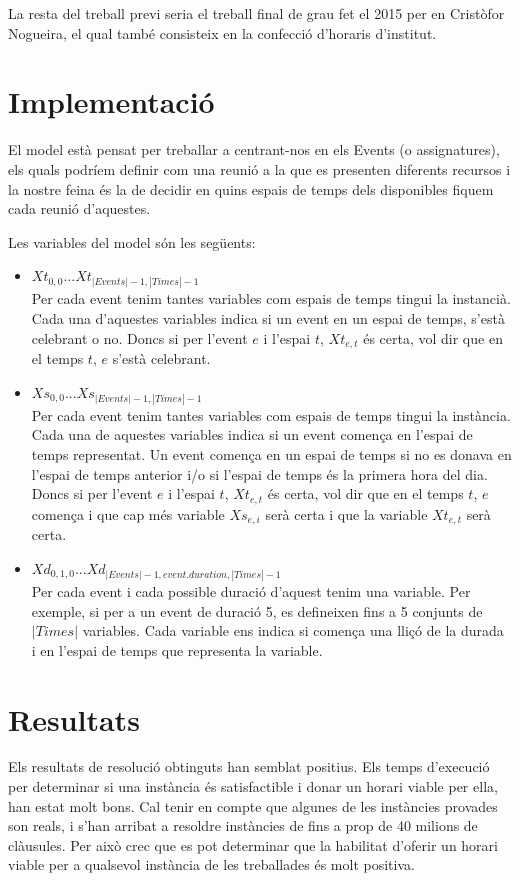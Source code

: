 \documentclass[11pt,a4paper,oneside]{article}
\begin{document}
    La resta del treball previ seria el treball final de grau fet el 2015 per en Cristòfor Nogueira, el qual també consisteix en la confecció d'horaris d'institut.

  \section{Implementació}


  El model està pensat per treballar a centrant-nos en els Events (o assignatures), 
  els quals podríem definir com una reunió a la que es presenten diferents recursos 
  i la nostre feina és la de decidir en quins espais de temps dels disponibles fiquem cada reunió d'aquestes.

  Les variables del model són les següents:
  \begin{itemize}
    \item $Xt_{0,0} . . . Xt_{|Events|-1,|Times|-1}$\\Per cada event tenim tantes variables com espais de temps tingui la instancià. Cada una d'aquestes variables indica si un event en un espai de temps, s'està celebrant o no. 
    Doncs si per l'event $e$ i l'espai $t$, $Xt_{e,t}$ és certa, vol dir que en el temps $t$, $e$ s'està celebrant.
    \item $Xs_{0,0} . . . Xs_{|Events|-1,|Times|-1}$\\Per cada event tenim tantes variables com espais de temps tingui la instància. Cada una de aquestes variables indica si un event comença en l'espai de temps representat. Un event comença en un espai de temps si no es donava en l'espai de temps anterior i/o si l'espai de temps és la primera hora del dia.
    Doncs si per l'event $e$ i l'espai $t$, $Xt_{e,t}$ és certa, vol dir que en el temps $t$, $e$ comença i que cap més variable $Xs_{e,i}$ serà certa i que la variable $Xt_{e,t}$ serà certa.
    \item $Xd_{0,1,0} . . . Xd_{|Events|-1, event.duration, |Times|-1}$\\ Per cada event i cada possible duració d'aquest tenim una variable. Per exemple, si per a un event de duració 5, es defineixen fins a 5 conjunts de $|Times|$ variables. 
    Cada variable ens indica si comença una lliçó de la durada i en l'espai de temps que representa la variable. 
  \end{itemize}


  \section{Resultats}
  Els resultats de resolució obtinguts han semblat positius. 
  Els temps d'execució per determinar si una instància és satisfactible i donar un horari viable per ella, han estat molt bons. 
  Cal tenir en compte que algunes de les instàncies provades son reals, i s'han arribat a resoldre instàncies de fins a prop de 40 milions de clàusules.
  Per això crec que es pot determinar que la habilitat d'oferir un horari viable per a qualsevol instància de les treballades és molt positiva.
\end{document}
